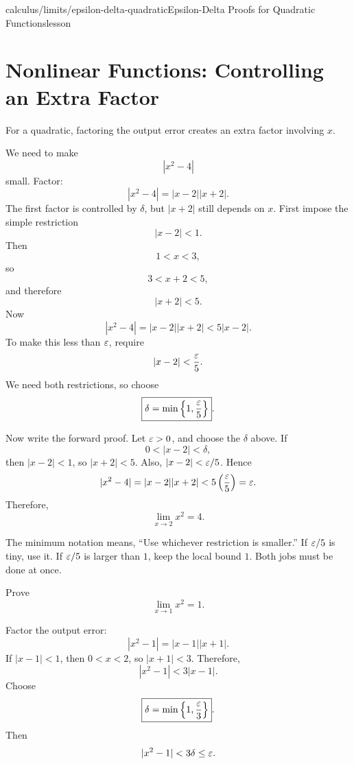 \begin{webpage}{calculus/limits/epsilon-delta-quadratic}{Epsilon-Delta Proofs for Quadratic Functions}{lesson}
\section{Nonlinear Functions: Controlling an Extra Factor}


For a quadratic, factoring the output error creates an extra factor involving \(x\).

\begin{bgexample}[title={Prove \(\lim_{x\to2}x^2=4\)}]
\begin{bgsolution}
We need to make
\[
  |x^2-4|
\]
small. Factor:
\[
  |x^2-4|=|x-2||x+2|.
\]
The first factor is controlled by \(\delta\), but \(|x+2|\) still depends on \(x\). First impose the simple restriction
\[
  |x-2|<1.
\]
Then
\[
  1<x<3,
\]
so
\[
  3<x+2<5,
\]
and therefore
\[
  |x+2|<5.
\]
Now
\[
  |x^2-4|=|x-2||x+2|<5|x-2|.
\]
To make this less than \(\varepsilon\), require
\[
  |x-2|<\frac{\varepsilon}5.
\]
We need both restrictions, so choose
\[
  \boxed{\delta=\min\left\{1,\frac{\varepsilon}5\right\}}.
\]

Now write the forward proof. Let \(\varepsilon>0\), and choose the \(\delta\) above. If
\[
  0<|x-2|<\delta,
\]
then \(|x-2|<1\), so \(|x+2|<5\). Also, \(|x-2|<\varepsilon/5\). Hence
\[
  |x^2-4|
  =|x-2||x+2|
  <5\left(\frac{\varepsilon}5\right)
  =\varepsilon.
\]
Therefore,
\[
  \boxed{\lim_{x\to2}x^2=4}.
\]
\end{bgsolution}
\end{bgexample}

\begin{bgconcept}
The minimum notation means, ``Use whichever restriction is smaller.'' If \(\varepsilon/5\) is tiny, use it. If \(\varepsilon/5\) is larger than \(1\), keep the local bound \(1\). Both jobs must be done at once.
\end{bgconcept}

\begin{bgexample}[title={A shifted square}]
Prove
\[
  \lim_{x\to1}x^2=1.
\]

\begin{bgsolution}
Factor the output error:
\[
  |x^2-1|=|x-1||x+1|.
\]
If \(|x-1|<1\), then \(0<x<2\), so \(|x+1|<3\). Therefore,
\[
  |x^2-1|<3|x-1|.
\]
Choose
\[
  \boxed{\delta=\min\left\{1,\frac{\varepsilon}3\right\}}.
\]
Then
\[
  |x^2-1|<3\delta\le\varepsilon.
\]
\end{bgsolution}
\end{bgexample}
\end{webpage}

